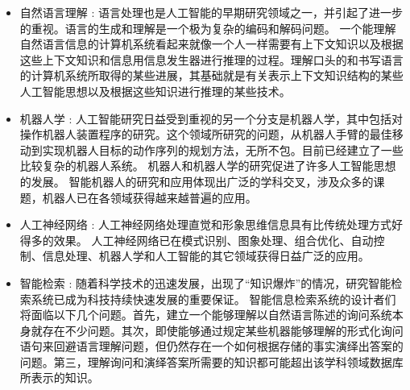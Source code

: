 \documentclass[UTF8,a4paper]{ctexart}
\begin{document}
\begin{itemize}
	\item 自然语言理解 : 语言处理也是人工智能的早期研究领域之一，并引起了进一步的重视。语言的生成和理解是一个极为复杂的编码和解码问题。
	      一个能理解自然语言信息的计算机系统看起来就像一个人一样需要有上下文知识以及根据这些上下文知识和信息用信息发生器进行推理的过程。理解口头的和书写语言的计算机系统所取得的某些进展，其基础就是有关表示上下文知识结构的某些人工智能思想以及根据这些知识进行推理的某些技术。

	\item 机器人学 : 人工智能研究日益受到重视的另一个分支是机器人学，其中包括对操作机器人装置程序的研究。这个领域所研究的问题，从机器人手臂的最佳移动到实现机器人目标的动作序列的规划方法，无所不包。目前已经建立了一些比较复杂的机器人系统。
	      机器人和机器人学的研究促进了许多人工智能思想的发展。
	      智能机器人的研究和应用体现出广泛的学科交叉，涉及众多的课题，机器人已在各领域获得越来越普遍的应用。

	\item 人工神经网络 : 人工神经网络处理直觉和形象思维信息具有比传统处理方式好得多的效果。
	      人工神经网络已在模式识别、图象处理、组合优化、自动控制、信息处理、机器人学和人工智能的其它领域获得日益广泛的应用。

	\item 智能检索 : 随着科学技术的迅速发展，出现了“知识爆炸”的情况，研究智能检索系统已成为科技持续快速发展的重要保证。
	      智能信息检索系统的设计者们将面临以下几个问题。首先，建立一个能够理解以自然语言陈述的询问系统本身就存在不少问题。其次，即使能够通过规定某些机器能够理解的形式化询问语句来回避语言理解问题，但仍然存在一个如何根据存储的事实演绎出答案的问题。第三，理解询问和演绎答案所需要的知识都可能超出该学科领域数据库所表示的知识。

\end{itemize}
\end{document}

